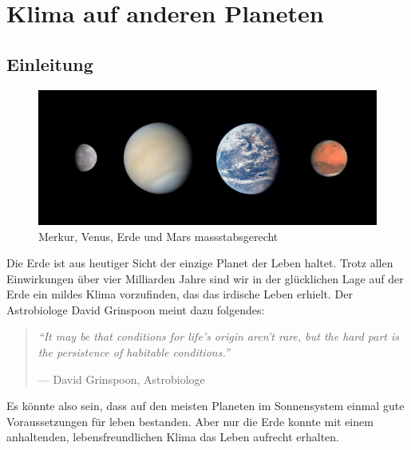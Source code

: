 %
%
%

\chapter{Klima auf anderen Planeten\label{chapter:planeten}}
\begin{refsection}

\section{Einleitung}

\begin{figure}
	\centering
	\includegraphics[width=0.7\linewidth, trim={0 2cm 0 2cm},clip]{planeten/Pictures/planets2.jpg}
	\caption{Merkur, Venus, Erde und Mars massstabsgerecht}
\end{figure}

Die Erde ist aus heutiger Sicht der einzige Planet der Leben haltet. Trotz allen Einwirkungen über vier Milliarden Jahre sind wir in der glücklichen Lage auf der Erde ein mildes Klima vorzufinden, das das irdische Leben erhielt. 
Der Astrobiologe David Grinspoon meint dazu folgendes:
\begin{quote}
\textit{“It may be that conditions for life’s origin aren’t rare, but the hard part is the persistence of habitable conditions.”}
\begin{flushright}
--- David Grinspoon, Astrobiologe \cite{planeten:AstrobiologyMagazine} %
\end{flushright}
\end{quote}
Es könnte also sein, dass auf den meisten Planeten im Sonnensystem einmal gute Voraussetzungen für leben bestanden. Aber nur die Erde konnte mit einem anhaltenden, lebensfreundlichen Klima das Leben aufrecht erhalten.


\end{refsection}
